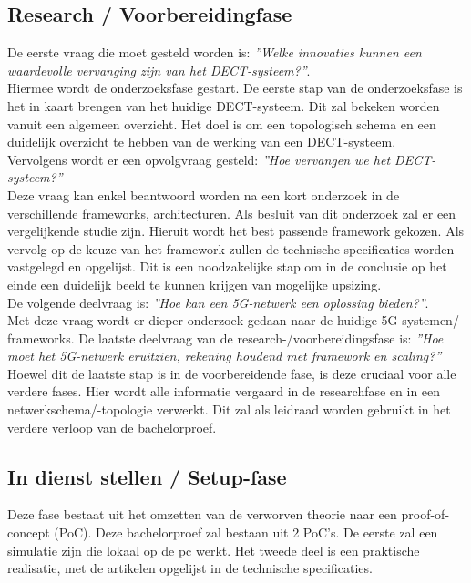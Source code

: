 \subsection{Research / Voorbereidingfase}
De eerste vraag die moet gesteld worden is: \textit{''Welke innovaties kunnen een waardevolle vervanging zijn van het DECT-systeem?''}.\\ 
Hiermee wordt de onderzoeksfase gestart. De eerste stap van de onderzoeksfase is het in kaart brengen van het huidige DECT-systeem. Dit zal bekeken worden vanuit een algemeen overzicht. Het doel is om een topologisch schema en een duidelijk overzicht te hebben van de werking van een DECT-systeem.\\
Vervolgens wordt er een opvolgvraag gesteld: \textit{''Hoe vervangen we het DECT-systeem?''}\\ Deze vraag kan enkel beantwoord worden na een kort onderzoek in de verschillende frameworks, architecturen. Als besluit van dit onderzoek zal er een vergelijkende studie zijn. Hieruit wordt het best passende framework gekozen.
Als vervolg op de keuze van het framework zullen de technische specificaties worden vastgelegd en opgelijst. Dit is een noodzakelijke stap om in de conclusie op het einde een duidelijk beeld te kunnen krijgen van mogelijke upsizing.\\
De volgende deelvraag is: \textit{''Hoe kan een 5G-netwerk een oplossing bieden?''}.\\ Met deze vraag wordt er dieper onderzoek gedaan naar de huidige 5G-systemen/-frameworks. De laatste deelvraag van de research-/voorbereidingsfase is: \textit{''Hoe moet het 5G-netwerk eruitzien, rekening houdend met framework en scaling?''}\\ Hoewel dit de laatste stap is in de voorbereidende fase, is deze cruciaal voor alle verdere fases. Hier wordt alle informatie vergaard in de researchfase en in een netwerkschema/-topologie verwerkt. Dit zal als leidraad worden gebruikt in het verdere verloop van de bachelorproef.
\subsection{In dienst stellen / Setup-fase}
Deze fase bestaat uit het omzetten van de verworven theorie naar een proof-of-concept (PoC). Deze bachelorproef zal bestaan uit 2 PoC's. De eerste zal een simulatie zijn die lokaal op de pc werkt. Het tweede deel is een praktische realisatie, met de artikelen opgelijst in de technische specificaties. 
